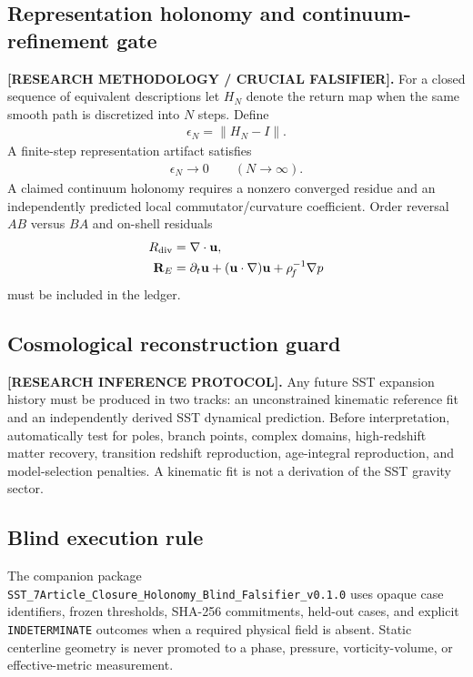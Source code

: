 \subsection{Representation holonomy and continuum-refinement gate}
\textbf{[RESEARCH METHODOLOGY / CRUCIAL FALSIFIER].}
For a closed sequence of equivalent descriptions let \(H_N\) denote the
return map when the same smooth path is discretized into \(N\) steps.  Define
\begin{align}
\epsilon_N=\|H_N-I\|.
\end{align}
A finite-step representation artifact satisfies
\begin{align}
\epsilon_N\rightarrow0
\qquad (N\rightarrow\infty).
\end{align}
A claimed continuum holonomy requires a nonzero converged residue and an
independently predicted local commutator/curvature coefficient.  Order reversal
\(AB\) versus \(BA\) and on-shell residuals
\begin{align}
R_{\rm div}&=\nabla\cdot\mathbf u,\\
\mathbf R_E&=\partial_t\mathbf u+(\mathbf u\cdot\nabla)\mathbf u
+\rho_{\!f}^{-1}\nabla p
\end{align}
must be included in the ledger.

\subsection{Cosmological reconstruction guard}
\textbf{[RESEARCH INFERENCE PROTOCOL].}
Any future SST expansion history must be produced in two tracks: an
unconstrained kinematic reference fit and an independently derived SST
dynamical prediction.  Before interpretation, automatically test for poles,
branch points, complex domains, high-redshift matter recovery, transition
redshift reproduction, age-integral reproduction, and model-selection
penalties.  A kinematic fit is not a derivation of the SST gravity sector.

\subsection{Blind execution rule}
The companion package
\texttt{SST\_7Article\_Closure\_Holonomy\_Blind\_Falsifier\_v0.1.0}
uses opaque case identifiers, frozen thresholds, SHA-256 commitments, held-out
cases, and explicit \texttt{INDETERMINATE} outcomes when a required physical
field is absent.  Static centerline geometry is never promoted to a phase,
pressure, vorticity-volume, or effective-metric measurement.
